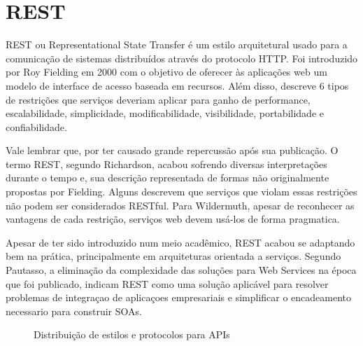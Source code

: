 \section{REST}

REST ou Representational State Transfer é um estilo arquitetural usado para a comunicação de sistemas distribuídos através do protocolo HTTP. Foi introduzido por Roy Fielding em 2000 com o objetivo de oferecer às aplicações web um modelo de interface de acesso baseada em recursos. Além disso, descreve 6 tipos de restrições que serviços deveriam aplicar para ganho de performance, escalabilidade, simplicidade, modificabilidade, visibilidade, portabilidade e confiabilidade.

Vale lembrar que, por ter causado grande repercussão após sua publicação. O termo REST, segundo Richardson, acabou sofrendo diversas interpretações durante o tempo e, sua descrição representada de formas não originalmente propostas por Fielding. Alguns descrevem que serviços que violam essas restrições não podem ser considerados RESTful. Para Wildermuth, apesar de reconhecer as vantagens de cada restrição, serviços web devem usá-los de forma pragmatica. \cite{RichardsonEtAl2013} \cite{Wildermuth2015}

Apesar de ter sido introduzido num meio acadêmico, REST acabou se adaptando bem na prática, principalmente em arquiteturas orientada a serviços. Segundo Pautasso, a eliminação da complexidade das soluções para Web Services na época que foi publicado, indicam REST como uma solução aplicável para resolver problemas de integraçao de aplicaçoes empresariais e simplificar o encadeamento necessario para construir SOAs. \cite{PautassoEtAl2008}

\begin{figure}[H]
  \centering
  \caption{Distribuição de estilos e protocolos para APIs}
\end{figure}


